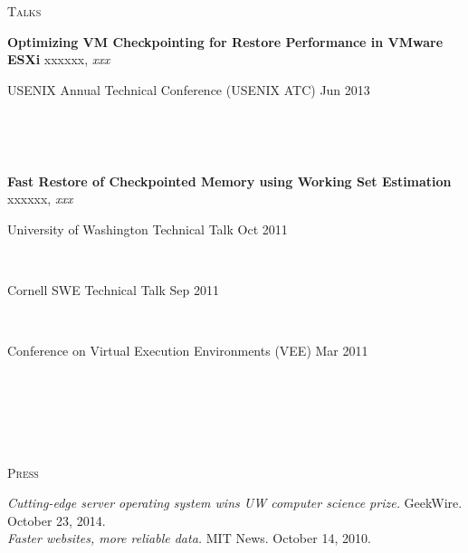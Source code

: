 \documentclass[10pt,times]{report}
\newlength{\sectiongap}
\newlength{\entrygap}
\newlength{\sectioncolwidth}
\newlength{\colgap}
\newlength{\stuffwidth}
\def\ifEqString#1#2{\def\testa{#1}\def\testb{#2}%
  \ifx\testa\testb}
\newenvironment{rtable}{
  \begin{minipage}{\textwidth}
  }{
  \end{minipage}
}
\newenvironment{rentry}[3][xxx]{
  \begin{minipage}[t]{\hsize}
    \textbf{#2}\ifEqString{#1}{xxx}\relax\else, \textit{#1}\fi
    \hspace{\stretch{1}} #3 \\
  }{
    \removelastskip
  \end{minipage}
  \\[\entrygap]  %
}
\newcommand{\rline}[2]{
  \begin{minipage}[t]{\hsize}
    #1 \hspace{\stretch{1}} #2
  \end{minipage} \\
}
\newenvironment{rsection}[1]{
  \begin{minipage}[t]{\sectioncolwidth}
    \textsc{#1}
  \end{minipage}
  \hspace{\colgap}
  \begin{minipage}[t]{\stuffwidth}
  }{
    \removelastskip
  \end{minipage}
  \\[\sectiongap]
}
\begin{document}
\begin{rtable}
\begin{rsection}{Talks}
    \begin{rentry}{Optimizing VM Checkpointing for Restore Performance
      in VMware ESXi}{} 
      \rline{USENIX Annual Technical Conference (USENIX ATC)}{Jun 2013}
    \end{rentry}

    \begin{rentry}{Fast Restore of Checkpointed Memory using Working
        Set Estimation}{}
      \rline{University of Washington Technical Talk}{Oct 2011}
      \rline{Cornell SWE Technical Talk}{Sep 2011}
      \rline{Conference on Virtual Execution Environments (VEE)}{Mar 2011}
    \end{rentry}
  \end{rsection}

  \begin{rsection}{Press}
    \textit{Cutting-edge server operating system wins UW computer
      science prize.} GeekWire. October 23, 2014.\\
    
    \textit{Faster websites, more reliable data.}
    MIT News. October 14, 2010.
  \end{rsection}

\end{rtable}
\end{document}
